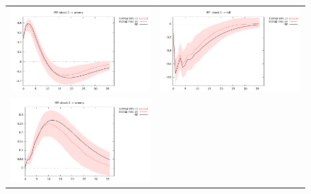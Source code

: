 \documentclass[a4paper,10pt]{article}
\newlength{\irfw}
\newlength{\irfh}
\begin{document}
\begin{figure}[htbp]
  \centering
  \begin{tabular}{cc}
    \includegraphics[width=\irfw, height=\irfh]{simpleC_11} &
    \includegraphics[width=\irfw, height=\irfh]{simpleC_12} \\
    \includegraphics[width=\irfw, height=\irfh]{simpleC_21} &

\end{tabular}
\end{figure}
\end{document}

